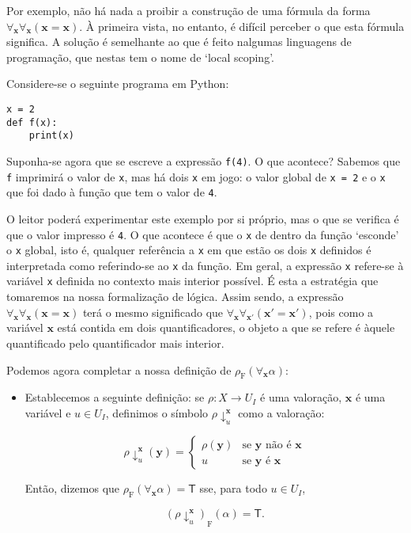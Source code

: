 \documentclass{report}
\theoremstyle{definition}
\theoremstyle{remark}
\renewcommand{\bf}[1]{\mathbf{#1}}
\newcommand{\F}{\mathrm{F}}
\newcommand{\lt}{\mathsf{T}}
\begin{document}
	Por exemplo, não há nada a proibir a construção de uma fórmula da forma $\forall_{\bf x} \forall_{\bf x} (\bf x = \bf x)$. À primeira vista, no entanto, é difícil perceber o que esta fórmula significa. A solução é semelhante ao que é feito nalgumas linguagens de programação, que nestas tem o nome de `local scoping'.
	
	Considere-se o seguinte programa em Python:
	
	\begin{lstlisting}
x = 2
def f(x):
    print(x)
	\end{lstlisting}
	Suponha-se agora que se escreve a expressão \texttt{f(4)}. O que acontece? Sabemos que \texttt{f} imprimirá o valor de \texttt{x}, mas há dois \texttt{x} em jogo: o valor global de \texttt{x = 2} e o \texttt{x} que foi dado à função que tem o valor de \texttt{4}.
	
	O leitor poderá experimentar este exemplo por si próprio, mas o que se verifica é que o valor impresso é \texttt{4}. O que acontece é que o \texttt{x} de dentro da função `esconde' o \texttt{x} global, isto é, qualquer referência a \texttt{x} em que estão os dois \texttt{x} definidos é interpretada como referindo-se ao \texttt{x} da função. Em geral, a expressão \texttt{x} refere-se à variável \texttt{x} definida no contexto mais interior possível. É esta a estratégia que tomaremos na nossa formalização de lógica. Assim sendo, a expressão $\forall_{\bf x} \forall_{\bf x} (\bf x = \bf x)$ terá o mesmo significado que $\forall_{\bf x} \forall_{\bf x'} (\bf x' = \bf x')$, pois como a variável $\bf x$ está contida em dois quantificadores, o objeto a que se refere é àquele quantificado pelo quantificador mais interior.
	
	Podemos agora completar a nossa definição de $\rho_\F(\forall_{\bf x} \alpha)$:
	
	\begin{itemize}
	\item Establecemos a seguinte definição: se $\rho : X \to U_I$ é uma valoração, $\bf x$ é uma variável e $u \in U_I$, definimos o símbolo $\rho\!\downarrow^{\bf x}_u$ como a valoração:
	
	\[\rho\!\downarrow^{\bf x}_u (\bf y) = \begin{cases}
	\rho(\bf y) & \text{se $\bf y$ não é $\bf x$}\\
	u & \text{se $\bf y$ é $\bf x$}
	\end{cases}\]
	
	Então, dizemos que $\rho_\F(\forall_{\bf x} \alpha) = \lt$ sse, para todo $u \in U_I$,
	
	\[(\rho\!\downarrow^{\bf x}_u)_\F(\alpha) = \lt.\]
	\end{itemize}
	
\end{document}
